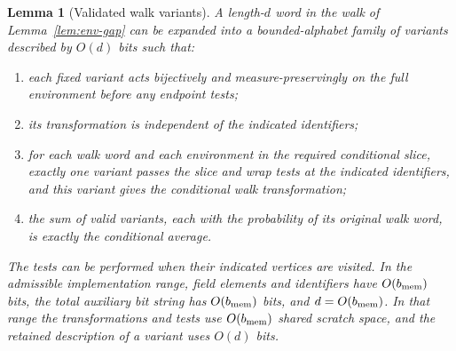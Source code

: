 \documentclass[11pt]{article}
\numberwithin{equation}{section}
\newtheorem{lemma}[theorem]{Lemma}
\theoremstyle{definition}
\theoremstyle{remark}
\begin{document}
\begin{lemma}[Validated walk variants]\label{lem:env-variants}
A length-$d$ word in the walk of Lemma~\ref{lem:env-gap} can be expanded
into a bounded-alphabet family of variants described by $O(d)$ bits
such that:
\begin{enumerate}
\item each fixed variant acts bijectively and measure-preservingly on
the full environment before any endpoint tests;
\item its transformation is independent of the indicated identifiers;
\item for each walk word and each environment in the required
conditional slice, exactly one variant passes the slice and wrap
tests at the indicated identifiers, and this variant gives the
conditional walk transformation;
\item the sum of valid variants, each with the probability of its
original walk word, is exactly the conditional average.
\end{enumerate}
The tests can be performed when their indicated vertices are visited.
In the admissible implementation range, field elements and identifiers
have $O({b_{\rm mem}})$ bits, the total auxiliary bit string has $O({b_{\rm mem}})$ bits, and $d=O({b_{\rm mem}})$.
In that range the transformations and tests use $O({b_{\rm mem}})$ shared scratch space, and
the retained description of a variant uses $O(d)$ bits.
\end{lemma}
\end{document}
